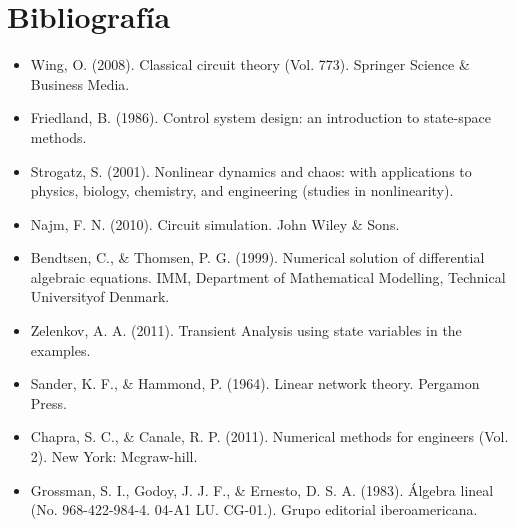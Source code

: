 \documentclass[10pt,a4paper]{article} %
\begin{document}
	\section{Bibliografía}
	\begin{itemize}
		\item	Wing, O. (2008). Classical circuit theory (Vol. 773). Springer Science \& Business Media.
		\item Friedland, B. (1986). Control system design: an introduction to state-space methods.
		\item Strogatz, S. (2001). Nonlinear dynamics and chaos: with applications to physics, biology, chemistry, and engineering (studies in nonlinearity).
		\item  Najm, F. N. (2010). Circuit simulation. John Wiley \& Sons.
		\item Bendtsen, C., \& Thomsen, P. G. (1999). Numerical solution of differential algebraic equations. IMM, Department of Mathematical Modelling, Technical Universityof Denmark.
		\item Zelenkov, A. A. (2011). Transient Analysis using state variables in the examples.
		\item Sander, K. F., \& Hammond, P. (1964). Linear network theory. Pergamon Press.
		\item Chapra, S. C., \& Canale, R. P. (2011). Numerical methods for engineers (Vol. 2). New York: Mcgraw-hill.
		\item Grossman, S. I., Godoy, J. J. F., \& Ernesto, D. S. A. (1983). Álgebra lineal (No. 968-422-984-4. 04-A1 LU. CG-01.). Grupo editorial iberoamericana.
	\end{itemize}
\end{document}
